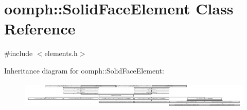 \hypertarget{classoomph_1_1SolidFaceElement}{}\section{oomph\+:\+:Solid\+Face\+Element Class Reference}
\label{classoomph_1_1SolidFaceElement}


{\ttfamily \#include $<$elements.\+h$>$}

Inheritance diagram for oomph\+:\+:Solid\+Face\+Element\+:\begin{figure}[H]
\begin{center}
\leavevmode
\includegraphics[height=1.298874cm]{classoomph_1_1SolidFaceElement}
\end{center}
\end{figure}
